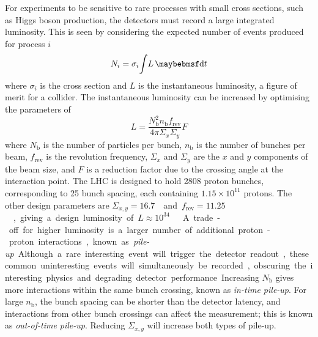 For experiments to be sensitive to rare processes with small cross sections, such as Higgs 
boson production, the detectors must record a large integrated luminosity. This is seen by 
considering the expected number of events produced for process $i$
\begin{equation}
	N_i = \sigma_i \! \int \! L \, \d{t}
	\label{eq:event_rate}
\end{equation}
where $\sigma_i$ is the cross section and $L$ is the instantaneous luminosity, a figure of 
merit for a collider. The instantaneous luminosity can be increased by optimising the
parameters of
\begin{equation}
	L = \frac{N_{\text{b}}^2 n_{\text{b}} f_{\text{rev}}}{4\pi \varSigma_x \varSigma_y} F
	\label{eq:lumi_beam}
\end{equation}
where $N_{\text{b}}$ is the number of particles per bunch, $n_{\text{b}}$ is the number of 
bunches per beam, $f_{\text{rev}}$ is the revolution frequency, $\varSigma_x$ and 
$\varSigma_y$ are the $x$ and $y$ components of the beam size, and $F$ is a reduction 
factor due to the crossing angle at the interaction point. The LHC is designed to 
hold 2808 proton bunches, corresponding to \unit{25}{\nano\second} bunch spacing, each 
containing $1.15\times10^{11}$ protons. The other design parameters are 
\unit{$\varSigma_{x,y} = 16.7$}{\micro\metre} and \unit{$f_{\text{rev}} = 11.25$}{\kHz}, 
giving a design luminosity of \unit{$L \approx 10^{34}$}{\lumiunits} \cite{LHC}.

A trade-off for higher luminosity is a larger number of additional proton-proton 
interactions, known as \textit{pile-up}. Although a rare interesting event will trigger 
the detector readout, these common uninteresting events will simultaneously be recorded, 
obscuring the interesting physics and degrading detector performance. Increasing 
$N_{\text{b}}$ gives more interactions within the same bunch crossing, known as 
\textit{in-time pile-up}. For large $n_{\text{b}}$, the bunch spacing can be shorter than 
the detector latency, and interactions from other bunch crossings can affect the 
measurement; this is known as \textit{out-of-time pile-up}. Reducing $\varSigma_{x,y}$ 
will increase both types of pile-up.

